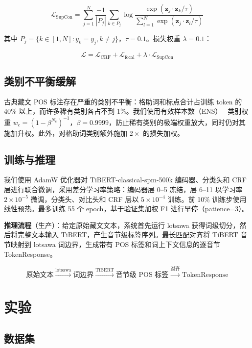 \documentclass[11pt,a4paper]{article}
\begin{document}
\begin{equation}
\mathcal{L}_{\text{SupCon}} = \sum_{j=1}^{N} \frac{-1}{|P_j|} \sum_{k \in P_j} \log \frac{\exp(\mathbf{z}_j \cdot \mathbf{z}_k / \tau)}{\sum_{l=1}^{N} \exp(\mathbf{z}_j \cdot \mathbf{z}_l / \tau)}
\end{equation}

其中 $P_j = \{k \in [1,N] : y_k = y_j, k \neq j\}$，$\tau=0.1$。损失权重 $\lambda=0.1$：

\begin{equation}
\mathcal{L} = \mathcal{L}_{\text{CRF}} + \mathcal{L}_{\text{focal}} + \lambda \cdot \mathcal{L}_{\text{SupCon}}
\end{equation}

\subsection{类别不平衡缓解}

古典藏文 POS 标注存在严重的类别不平衡：格助词和标点合计占训练 token 的 40\% 以上，而许多稀有类别各占不到 1\%。我们使用有效样本数（ENS）~\cite{cui2019} 类别权重 $w_c = (1 - \beta^{N_c})^{-1}$，$\beta=0.9999$，防止稀有类别的极端权重放大，同时仍对其施加升权。此外，对格助词类别额外施加 $2\times$ 的损失加权。

\subsection{训练与推理}

我们使用 AdamW 优化器对 TiBERT-classical-spm-500k 编码器、分类头和 CRF 层进行联合微调，采用差分学习率策略：编码器层 0--5 冻结，层 6--11 以学习率 $2 \times 10^{-5}$ 微调，分类头、对比头和 CRF 层以 $5 \times 10^{-4}$ 训练。前 10\% 训练步使用线性预热。最多训练 55 个 epoch，基于验证集加权 F1 进行早停（patience=3）。

\textbf{推理流程}（生产）：给定原始藏文文本，系统首先运行 lotsawa 获得词级切分，然后将完整文本输入 TiBERT，产生音节级标签序列。最长匹配对齐将 TiBERT 音节映射到 lotsawa 词边界，生成带有 POS 标签和词上下文信息的逐音节 TokenResponse。

\[
\text{原始文本} \xrightarrow{\text{lotsawa}} \text{词边界} \xrightarrow{\text{TiBERT}} \text{音节级 POS 标签} \xrightarrow{\text{对齐}} \text{TokenResponse}
\]

\section{实验}

\subsection{数据集}
\end{document}
